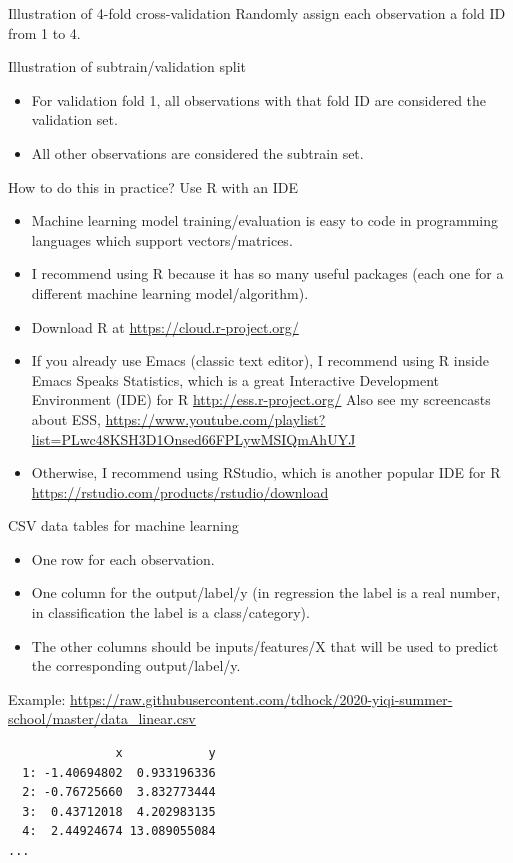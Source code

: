 \documentclass[12pt]{article}
\begin{document}
{Illustration of 4-fold cross-validation}
Randomly assign each observation a fold ID from 1 to 4.

{Illustration of subtrain/validation split}
\begin{itemize}
\item For validation fold 1, all observations with that fold ID are
  considered the validation set.
\item All other observations are considered the subtrain set.
\end{itemize}

{How to do this in practice? Use R with an IDE}
\begin{itemize}
\item Machine learning model training/evaluation is easy to code in
  programming languages which support vectors/matrices.
\item I recommend using R because it has so many useful packages
  (each one for a different machine learning model/algorithm).
\item Download R at \url{https://cloud.r-project.org/}
\item If you already use Emacs (classic text editor), I recommend
  using R inside Emacs Speaks Statistics, which is a great
  Interactive Development Environment (IDE) for R
  \url{http://ess.r-project.org/} Also see my screencasts about ESS,
  \url{https://www.youtube.com/playlist?list=PLwc48KSH3D1Onsed66FPLywMSIQmAhUYJ}
\item Otherwise, I recommend using RStudio, which is another popular
  IDE for R
  \url{https://rstudio.com/products/rstudio/download}
\end{itemize}

{CSV data tables for machine learning}
\begin{itemize}
\item One row for each observation.
\item One column for the output/label/y (in regression the label is a real
  number, in classification the label is a class/category).
\item The other columns should be inputs/features/X that will be used
  to predict the corresponding output/label/y.
\end{itemize}
  Example:
  \url{https://raw.githubusercontent.com/tdhock/2020-yiqi-summer-school/master/data_linear.csv}
\begin{verbatim}
               x            y
  1: -1.40694802  0.933196336
  2: -0.76725660  3.832773444
  3:  0.43712018  4.202983135
  4:  2.44924674 13.089055084
...
\end{verbatim}
\end{document}
